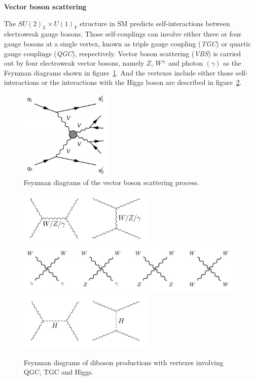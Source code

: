 \textbf{Vector boson scattering}

The $SU(2)_{L} \times U(1)_{Y}$ structure in SM predicts self-interactions between electroweak gauge bosons.
Those self-couplings can involve either three or four gauge bosons at a single vertex, known as triple gauge coupling (\textit{TGC}) or
quartic gauge couplings (\textit{QGC}), respectively.
Vector boson scattering (\textit{VBS}) is carried out 
by four electroweak vector bosons, namely $Z$, $W^{\pm}$ and photon $(\gamma)$ as the Feynman diagrams shown in figure~\ref{fig:vbs_fd1}. 
And the vertexes include either those self-interactions
or the interactions with the Higgs boson are described in figure~\ref{fig:vbs_fd2}.
\begin{figure}[!htb]
  \centering
  \includegraphics[width=0.4\textwidth]{figures/Theory/VBS.png} 
  \caption{Feynman diagrams of the vector boson scattering process.}
  \label{fig:vbs_fd1}
\end{figure}
\begin{figure}[!htb]
  \centering
  \includegraphics[width=0.6\textwidth]{figures/Theory/vbs_tgc.png} \\
  \includegraphics[width=1.0\textwidth]{figures/Theory/vbs_qgc.png} \\
  \includegraphics[width=0.6\textwidth]{figures/Theory/vbs_higgs.png} 
  \caption{Feynman disgrams of diboson productions with vertexes involving QGC, TGC and Higgs.}
  \label{fig:vbs_fd2}
\end{figure}

